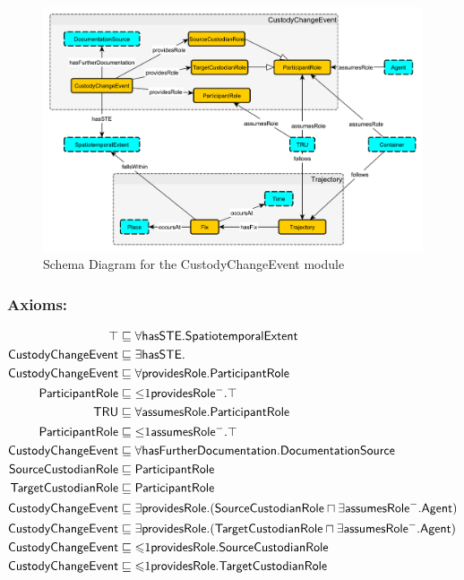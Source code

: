 \begin{figure}[tb]
\begin{center}
\includegraphics[width=.9\textwidth]{diagrams/custody-change_event}
\end{center}
\caption{Schema Diagram for the CustodyChangeEvent module}
\label{fig:CustodyChangeEvent}
\end{figure}

\subsubsection*{Axioms:}
\begin{align}
\top &\sqsubseteq \forall\textsf{hasSTE.SpatiotemporalExtent}\\
\textsf{CustodyChangeEvent} &\sqsubseteq \exists\textsf{hasSTE.}\\
\textsf{CustodyChangeEvent} &\sqsubseteq \forall\textsf{providesRole.ParticipantRole}\\
\textsf{ParticipantRole} &\sqsubseteq \mathord{\leq} 1 \textsf{providesRole}\mathord{^-}.\top\\
\textsf{TRU} &\sqsubseteq \forall\textsf{assumesRole.ParticipantRole}\\
\textsf{ParticipantRole} &\sqsubseteq \mathord{\leq} 1 \textsf{assumesRole}\mathord{^-}.\top\\
\textsf{CustodyChangeEvent} &\sqsubseteq \forall\textsf{hasFurtherDocumentation.DocumentationSource} \\
\textsf{SourceCustodianRole} &\sqsubseteq \textsf{ParticipantRole}\\
\textsf{TargetCustodianRole} &\sqsubseteq \textsf{ParticipantRole}\\
\textsf{CustodyChangeEvent} &\sqsubseteq \exists\textsf{providesRole}.(\textsf{SourceCustodianRole} \sqcap \exists \textsf{assumesRole}^-.\textsf{Agent})\\
\textsf{CustodyChangeEvent} &\sqsubseteq \exists\textsf{providesRole}.(\textsf{TargetCustodianRole} \sqcap \exists \textsf{assumesRole}^-.\textsf{Agent})\\
\textsf{CustodyChangeEvent} &\sqsubseteq \mathord{\mathord{\leqslant}}1\textsf{providesRole.SourceCustodianRole}\\
\textsf{CustodyChangeEvent} &\sqsubseteq \mathord{\mathord{\leqslant}}1\textsf{providesRole.TargetCustodianRole} 
\end{align}

